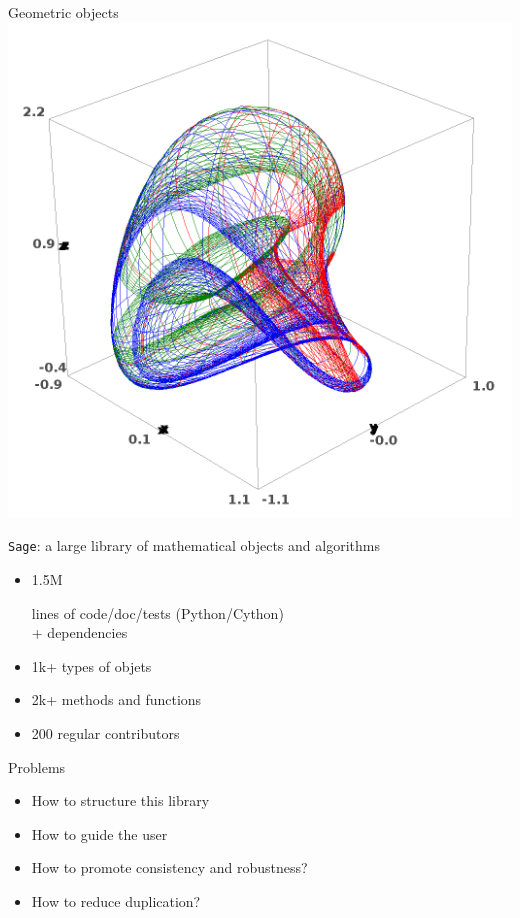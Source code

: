 \documentclass[%
]{beamer}
\newcommand{\fr}[1]{}
\newcommand{\en}[1]{#1}
\newcommand{\Sage}{\texttt{Sage}\xspace}
\begin{document}
\begin{frame}{\fr{Objets géométriques}\en{Geometric objects}}
{    \includegraphics[height=.5\textheight]{manifold.png}}
\end{frame}

\begin{frame}{
    \fr{\Sage: une bibliothèque large\\ d'objets mathématiques et d'algorithmes}
    \en{\Sage: a large library of mathematical objects and algorithms}
  }
  \begin{itemize}
  \item 1.5M
    \fr{lignes de code/doc/tests (Python/Cython)}
    \en{lines of code/doc/tests (Python/Cython)}
    \\
    \fr{+ dépendances}
    \en{+ dependencies}
  \item 1k+ types \fr{d'}\en{of } objets
  \item 2k+ \fr{méthodes and fonctions}\en{methods and functions}
  \item 200 \fr{contributeurs réguliers}\en{regular contributors}
  \end{itemize}
  \pause
  \begin{block}{\fr{Problèmes}\en{Problems}}
    \begin{itemize}
    \item \fr{Comment structurer cette bibliothèque?}
      \en{How to structure this library}
    \item \fr{Comment guider l'utilisateur}
      \en{How to guide the user}
    \item \fr{Comment garantir la cohérence, la robustesse?}
      \en{How to promote consistency and robustness?}
    \item \fr{Comment éviter les duplications?}
      \en{How to reduce duplication?}
    \end{itemize}
  \end{block}
\end{frame}
\end{document}
